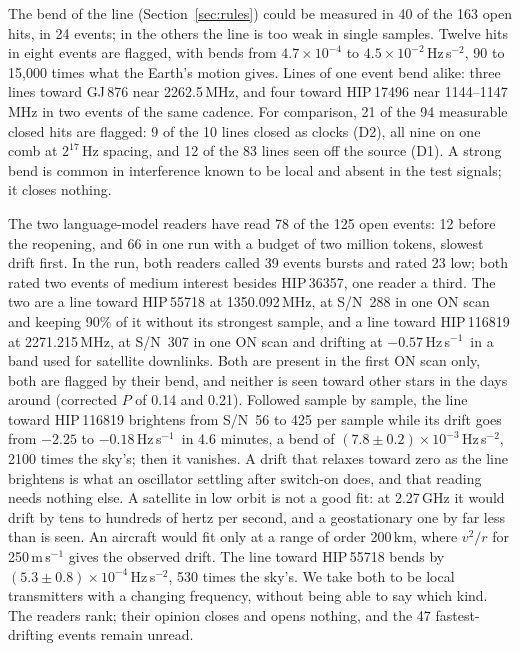 \documentclass[twocolumn]{aastex631}
\newcommand{\hzs}{Hz\,s$^{-1}$}
\newcommand{\sn}{S/N}
\begin{document}
The bend of the line (Section~\ref{sec:rules}) could be measured in 40 of
the 163 open hits, in 24 events; in the others the line is too weak in
single samples. Twelve hits in eight events are flagged, with bends from
$4.7\times10^{-4}$ to $4.5\times10^{-2}$\,Hz\,s$^{-2}$, 90 to 15{,}000 times
what the Earth's motion gives. Lines of one event bend alike: three lines
toward GJ\,876 near 2262.5\,MHz, and four toward HIP\,17496 near
1144--1147\,MHz in two events of the same cadence. For comparison, 21 of the
94 measurable closed hits are flagged: 9 of the 10 lines closed as clocks
(D2), all nine on one comb at $2^{17}$\,Hz spacing, and 12 of the 83 lines
seen off the source (D1). A strong bend is common in interference known to be local and
absent in the test signals; it closes nothing.

The two language-model readers have read 78 of the 125 open events: 12
before the reopening, and 66 in one run with a budget of two million
tokens, slowest drift first. In the run, both readers called 39 events
bursts and rated 23 low; both rated two events of medium interest besides
HIP\,36357, one reader a third. The two are a line toward HIP\,55718 at
1350.092\,MHz, at \sn\ 288 in one ON scan and keeping 90\% of it without
its strongest sample, and a line toward HIP\,116819 at 2271.215\,MHz, at
\sn\ 307 in one ON scan and drifting at $-0.57$\,\hzs\ in a band used for
satellite downlinks. Both are present in the first ON scan only, both
are flagged by their bend, and neither is seen toward other stars in the
days around (corrected $P$ of 0.14 and 0.21). Followed sample by sample,
the line toward HIP\,116819 brightens from \sn\ 56 to 425 per sample while
its drift goes from $-2.25$ to $-0.18$\,\hzs\ in 4.6 minutes, a bend of
$(7.8\pm0.2)\times10^{-3}$\,Hz\,s$^{-2}$, 2100 times the sky's; then it
vanishes. A drift that relaxes toward zero as the line brightens is what an
oscillator settling after switch-on does, and that reading needs nothing
else. A satellite in low orbit is not a good fit: at 2.27\,GHz it would
drift by tens to hundreds of hertz per second, and a geostationary one by
far less than is seen. An aircraft would fit only at a range of order
200\,km, where $v^2/r$ for 250\,m\,s$^{-1}$ gives the observed drift. The
line toward HIP\,55718 bends by $(5.3\pm0.8)\times10^{-4}$\,Hz\,s$^{-2}$,
530 times the sky's. We take both to be local transmitters with a changing
frequency, without being able to say which kind. The readers rank; their
opinion closes and opens nothing, and the 47 fastest-drifting events remain
unread.
\end{document}
